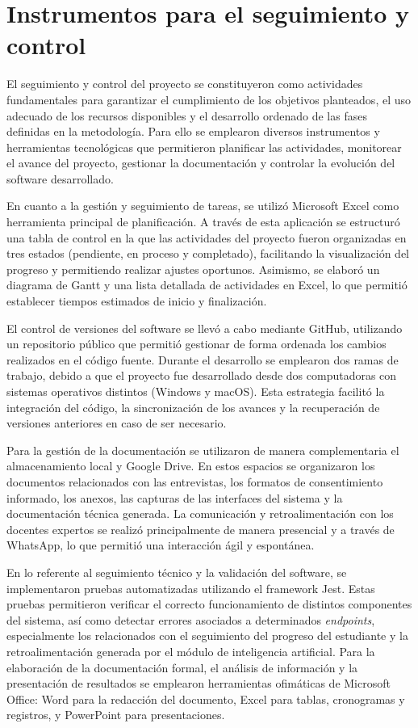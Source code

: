 \section{Instrumentos para el seguimiento y control}

El seguimiento y control del proyecto se constituyeron como actividades fundamentales para garantizar el cumplimiento de los objetivos planteados, el uso adecuado de los recursos disponibles y el desarrollo ordenado de las fases definidas en la metodología. Para ello se emplearon diversos instrumentos y herramientas tecnológicas que permitieron planificar las actividades, monitorear el avance del proyecto, gestionar la documentación y controlar la evolución del software desarrollado.

En cuanto a la gestión y seguimiento de tareas, se utilizó Microsoft Excel como herramienta principal de planificación. A través de esta aplicación se estructuró una tabla de control en la que las actividades del proyecto fueron organizadas en tres estados (pendiente, en proceso y completado), facilitando la visualización del progreso y permitiendo realizar ajustes oportunos. Asimismo, se elaboró un diagrama de Gantt y una lista detallada de actividades en Excel, lo que permitió establecer tiempos estimados de inicio y finalización.

El control de versiones del software se llevó a cabo mediante GitHub, utilizando un repositorio público que permitió gestionar de forma ordenada los cambios realizados en el código fuente. Durante el desarrollo se emplearon dos ramas de trabajo, debido a que el proyecto fue desarrollado desde dos computadoras con sistemas operativos distintos (Windows y macOS). Esta estrategia facilitó la integración del código, la sincronización de los avances y la recuperación de versiones anteriores en caso de ser necesario.

Para la gestión de la documentación se utilizaron de manera complementaria el almacenamiento local y Google Drive. En estos espacios se organizaron los documentos relacionados con las entrevistas, los formatos de consentimiento informado, los anexos, las capturas de las interfaces del sistema y la documentación técnica generada. La comunicación y retroalimentación con los docentes expertos se realizó principalmente de manera presencial y a través de WhatsApp, lo que permitió una interacción ágil y espontánea.

En lo referente al seguimiento técnico y la validación del software, se implementaron pruebas automatizadas utilizando el framework Jest. Estas pruebas permitieron verificar el correcto funcionamiento de distintos componentes del sistema, así como detectar errores asociados a determinados \textit{endpoints}, especialmente los relacionados con el seguimiento del progreso del estudiante y la retroalimentación generada por el módulo de inteligencia artificial. Para la elaboración de la documentación formal, el análisis de información y la presentación de resultados se emplearon herramientas ofimáticas de Microsoft Office: Word para la redacción del documento, Excel para tablas, cronogramas y registros, y PowerPoint para presentaciones.

